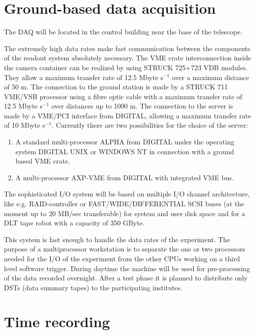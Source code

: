 \section{Ground-based data acquisition}

 The DAQ will be located in the control building
near the base of the telescope.

\medskip The extremely high data rates make fast communication between the
components of the readout system absolutely necessary. The VME crate
interconnection inside the camera 
container can be realized by using STRUCK 725+723
VDB modules. They allow a maximum transfer rate of
12.5 Mbyte s$^{-1}$ over a maximum distance of 50 m. The connection to the
ground station is made by a STRUCK 711 VME/VSB processor using a fibre optic
cable with a maximum transfer rate of 12.5 Mbyte s$^{-1}$ over distances up
to 1000 m. The connection to the server is made by a VME/PCI interface from
DIGITAL, allowing a maximum transfer rate of 10 Mbyte s$^{-1}$. Currently there are
two possibilities for the choice of the server:

\begin{enumerate}
\item  A standard multi-processor ALPHA from DIGITAL under the
operating system DIGITAL UNIX or WINDOWS NT in connection with a ground based VME crate.

\item  A multi-processor AXP-VME from DIGITAL with integrated VME bus.
\end{enumerate}

The sophisticated I/O system will be based on multiple I/O channel architecture,
like e.g. RAID-controller or FAST/WIDE/DIFFERENTIAL
SCSI buses (at the moment up to 20 MB/sec transferable)
for system and user disk space and for
a DLT tape robot with a capacity of 350 GByte.

This system is fast enough to handle the data rates of the experiment.
The purpose of a multiprocessor workstation is to separate
the one or two processors needed for the I/O of the experiment from the
other CPUs working on a third level software trigger. During daytime the
machine will be used for pre-processing of the data recorded overnight.
After a test phase it is planned to distribute only DSTs (data summary
tapes) to the participating institutes.

\section{Time recording} 


